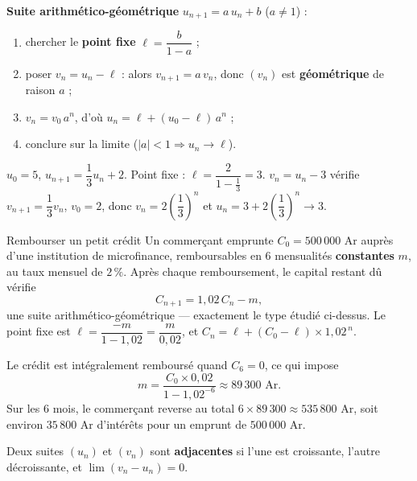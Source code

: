 \begin{methode}
	\textbf{Suite arithmético-géométrique} $u_{n+1}=a\,u_n+b$ ($a\neq 1$) :
	\begin{enumerate}
		\item chercher le \textbf{point fixe} $\ell=\dfrac{b}{1-a}$ ;
		\item poser $v_n=u_n-\ell$ : alors $v_{n+1}=a\,v_n$, donc $(v_n)$ est
		\textbf{géométrique} de raison $a$ ;
		\item $v_n=v_0\,a^{n}$, d'où $u_n=\ell+(u_0-\ell)\,a^{n}$ ;
		\item conclure sur la limite ($|a|<1\Rightarrow u_n\to\ell$).
	\end{enumerate}
\end{methode}

\begin{exemple}
	$u_0=5$, $u_{n+1}=\dfrac13 u_n+2$. Point fixe : $\ell=\dfrac{2}{1-\frac13}=3$.
	$v_n=u_n-3$ vérifie $v_{n+1}=\dfrac13 v_n$, $v_0=2$, donc
	$v_n=2\left(\dfrac13\right)^{n}$ et $u_n=3+2\left(\dfrac13\right)^{n}\to 3$.
\end{exemple}

\begin{vraievie}{Rembourser un petit crédit}
	Un commerçant emprunte $C_0 = 500\,000$ Ar auprès d'une institution de
	microfinance, remboursables en $6$ mensualités \textbf{constantes} $m$,
	au taux mensuel de $2\,\%$. Après chaque remboursement, le capital
	restant dû vérifie
	\[
	C_{n+1} = 1{,}02\,C_n - m,
	\]
	une suite arithmético-géométrique --- exactement le type étudié
	ci-dessus. Le point fixe est $\ell = \dfrac{-m}{1-1{,}02} = \dfrac{m}{0{,}02}$,
	et $C_n = \ell + (C_0-\ell)\times 1{,}02^{\,n}$.

	Le crédit est intégralement remboursé quand $C_6=0$, ce qui impose
	\[
	m = \frac{C_0\times 0{,}02}{1-1{,}02^{-6}} \approx 89\,300 \text{ Ar}.
	\]
	Sur les $6$ mois, le commerçant reverse au total $6\times 89\,300
	\approx 535\,800$ Ar, soit environ $35\,800$ Ar d'intérêts pour un
	emprunt de $500\,000$ Ar.

\end{vraievie}

\begin{definition}
	Deux suites $(u_n)$ et $(v_n)$ sont \textbf{adjacentes} si l'une est
	croissante, l'autre décroissante, et $\displaystyle\lim(v_n-u_n)=0$.
\end{definition}

